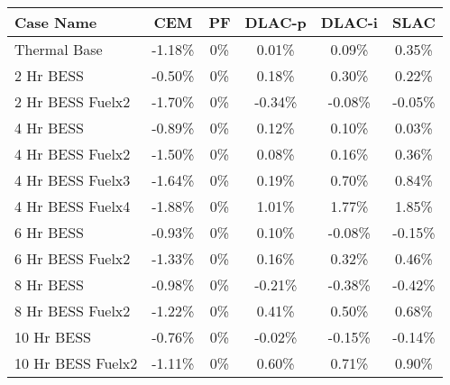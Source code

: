 \begin{tabular}{lccccc}
\toprule
Case Name & CEM & PF & DLAC-p & DLAC-i & SLAC \\
\midrule
Thermal Base & -1.18\% & 0\% & 0.01\% & 0.09\% & 0.35\% \\
2 Hr BESS & -0.50\% & 0\% & 0.18\% & 0.30\% & 0.22\% \\
2 Hr BESS Fuelx2 & -1.70\% & 0\% & -0.34\% & -0.08\% & -0.05\% \\
4 Hr BESS & -0.89\% & 0\% & 0.12\% & 0.10\% & 0.03\% \\
4 Hr BESS Fuelx2 & -1.50\% & 0\% & 0.08\% & 0.16\% & 0.36\% \\
4 Hr BESS Fuelx3 & -1.64\% & 0\% & 0.19\% & 0.70\% & 0.84\% \\
4 Hr BESS Fuelx4 & -1.88\% & 0\% & 1.01\% & 1.77\% & 1.85\% \\
6 Hr BESS & -0.93\% & 0\% & 0.10\% & -0.08\% & -0.15\% \\
6 Hr BESS Fuelx2 & -1.33\% & 0\% & 0.16\% & 0.32\% & 0.46\% \\
8 Hr BESS & -0.98\% & 0\% & -0.21\% & -0.38\% & -0.42\% \\
8 Hr BESS Fuelx2 & -1.22\% & 0\% & 0.41\% & 0.50\% & 0.68\% \\
10 Hr BESS & -0.76\% & 0\% & -0.02\% & -0.15\% & -0.14\% \\
10 Hr BESS Fuelx2 & -1.11\% & 0\% & 0.60\% & 0.71\% & 0.90\% \\
\bottomrule
\end{tabular}
